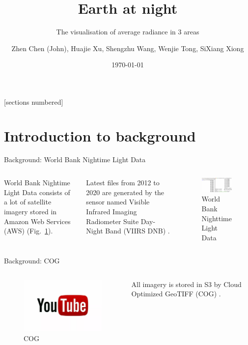 \documentclass[aspectratio=169]{beamer}
\title{Earth at night}
\subtitle{The visualisation of average radiance in 3 areas}
\date{\today}
\author{Zhen Chen (John), Huajie Xu, Shengzhu Wang, Wenjie Tong, SiXiang Xiong}
\begin{document}
 
\maketitle

\begin{frame}{}
  [sections numbered]
  \tableofcontents[hideallsubsections]
\end{frame}

\section{Introduction to background}

\begin{frame}[fragile]{Background: World Bank Nightime Light Data}

  \begin{columns}
    World Bank Nightime Light Data consists of a lot of satellite imagery 
    stored in Amazon Web Services (AWS) (Fig.~\ref{wbs3}). 
    
    Latest files from 2012 to 2020 are generated by the sensor 
    named Visible Infrared Imaging Radiometer Suite Day-Night Band (VIIRS DNB) \citep{WorldBan13:online}.
    
      \begin{figure}[htbp]
        \centerline{\includegraphics[width=200pt]{images/3.1.png}}
        \caption{World Bank Nighttime Light Data}
        \label{wbs3}
      \end{figure}
    \end{columns}
  \end{frame}
  
\begin{frame}[fragile]{Background: COG}

  \begin{columns}
    
    \begin{figure}[htbp]
      \centerline{\includegraphics[width=200pt]{images/youtube.png}}
      \caption{COG}
      \label{youtube}
    \end{figure}

    All imagery is stored in S3 by Cloud Optimized GeoTIFF (COG) \citep{CloudOpt5:online}.
  \end{columns}
\end{frame}
\end{document}
